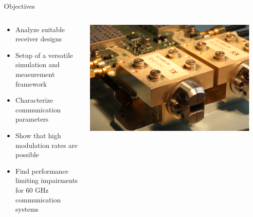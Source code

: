 \documentclass[10pt]{beamer}
\begin{document}
\begin{frame}{Objectives}
  \begin{columns}[T]
    \begin{column}{.6\textwidth}
      \begin{itemize}
      \item Analyze suitable receiver designs
      \item Setup of a versatile simulation and measurement framework
      \item Characterize communication parameters
      \item Show that high modulation rates are possible
      \item Find performance limiting impairments for 60 GHz communication systems
      \end{itemize}
    \end{column}
    \begin{column}{.4\textwidth}
      \includegraphics[width=\textwidth]{pictures/sivers_ant}
    \end{column}
  \end{columns}
\end{frame}
\end{document}
